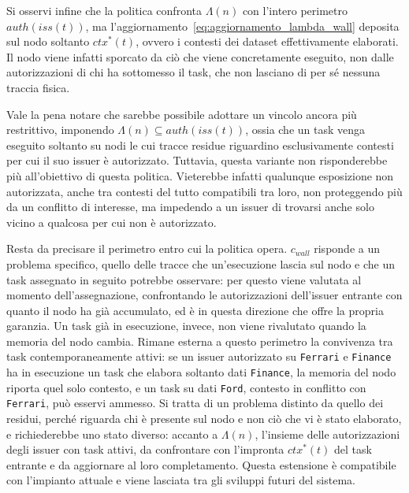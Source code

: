 Si osservi infine che la politica confronta $\Lambda(n)$ con l'intero perimetro $auth(iss(t))$, ma l'aggiornamento~\eqref{eq:aggiornamento_lambda_wall} deposita sul nodo soltanto $ctx^*(t)$, ovvero i contesti dei dataset effettivamente elaborati. Il nodo viene infatti sporcato da ciò che viene concretamente eseguito, non dalle autorizzazioni di chi ha sottomesso il task, che non lasciano di per sé nessuna traccia fisica.

Vale la pena notare che sarebbe possibile adottare un vincolo ancora più restrittivo, imponendo $\Lambda(n) \subseteq auth(iss(t))$, ossia che un task venga eseguito soltanto su nodi le cui tracce residue riguardino esclusivamente contesti per cui il suo issuer è autorizzato. Tuttavia, questa variante non risponderebbe più all'obiettivo di questa politica. Vieterebbe infatti qualunque esposizione non autorizzata, anche tra contesti del tutto compatibili tra loro, non proteggendo più da un conflitto di interesse, ma impedendo a un issuer di trovarsi anche solo vicino a qualcosa per cui non è autorizzato. 

Resta da precisare il perimetro entro cui la politica opera. $c_{wall}$ risponde a un problema specifico, quello delle tracce che un'esecuzione lascia sul nodo e che un task assegnato in seguito potrebbe osservare: per questo viene valutata al momento dell'assegnazione, confrontando le autorizzazioni dell'issuer entrante con quanto il nodo ha già accumulato, ed è in questa direzione che offre la propria garanzia. Un task già in esecuzione, invece, non viene rivalutato quando la memoria del nodo cambia. Rimane esterna a questo perimetro la convivenza tra task contemporaneamente attivi: se un issuer autorizzato su \texttt{Ferrari} e \texttt{Finance} ha in esecuzione un task che elabora soltanto dati \texttt{Finance}, la memoria del nodo riporta quel solo contesto, e un task su dati \texttt{Ford}, contesto in conflitto con \texttt{Ferrari}, può esservi ammesso. Si tratta di un problema distinto da quello dei residui, perché riguarda chi è presente sul nodo e non ciò che vi è stato elaborato, e richiederebbe uno stato diverso: accanto a $\Lambda(n)$, l'insieme delle autorizzazioni degli issuer con task attivi, da confrontare con l'impronta $ctx^*(t)$ del task entrante e da aggiornare al loro completamento. Questa estensione è compatibile con l'impianto attuale e viene lasciata tra gli sviluppi futuri del sistema. 

